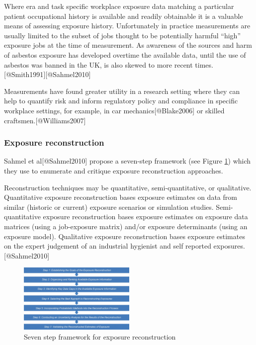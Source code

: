 \documentclass[
]{article}
\begin{document}
Where era and task specific workplace exposure data matching a
particular patient occupational history is available and readily
obtainable it is a valuable means of assessing exposure history.
Unfortunately in practice measurements are usually limited to the subset
of jobs thought to be potentially harmful ``high'' exposure jobs at the
time of measurement. As awareness of the sources and harm of asbestos
exposure has developed overtime the available data, until the use of
asbestos was banned in the UK, is also skewed to more recent
times.{[}@Smith1991{]}{[}@Sahmel2010{]}

Measurements have found greater utility in a research setting where they
can help to quantify risk and inform regulatory policy and compliance in
specific workplace settings, for example, in car
mechanics{[}@Blake2006{]} or skilled craftsmen.{[}@Williams2007{]}

\hypertarget{exposure-reconstruction}{%
\subsubsection{Exposure reconstruction}\label{exposure-reconstruction}}

Sahmel et al{[}@Sahmel2010{]} propose a seven-step framework (see Figure
\ref{ssframework}) which they use to enumerate and critique exposure
reconstruction approaches.

Reconstruction techniques may be quantitative, semi-quantitative, or
qualitative. Quantitative exposure reconstruction bases exposure
estimates on data from similar (historic or current) exposure scenarios
or simulation studies. Semi-quantitative exposure reconstruction bases
exposure estimates on exposure data matrices (using a job-exposure
matrix) and/or exposure determinants (using an exposure model).
Qualitative exposure reconstruction bases exposure estimates on the
expert judgement of an industrial hygienist and self reported
exposures.{[}@Sahmel2010{]}

\begin{figure}
\centering
\includegraphics[width=0.5\textwidth,height=\textheight]{source/figures/ssframework.png}
\caption{Seven step framework for exposure
reconstruction\label{ssframework}}
\end{figure}
\end{document}
